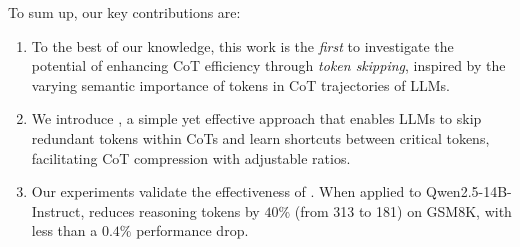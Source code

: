 To sum up, our key contributions are:
\begin{enumerate}
    \item To the best of our knowledge, this work is the \textit{first} to investigate the potential of enhancing CoT efficiency through \textit{token skipping}, inspired by the varying semantic importance of tokens in CoT trajectories of LLMs.
    \item We introduce \method, a simple yet effective approach that enables LLMs to skip redundant tokens within CoTs and learn shortcuts between critical tokens, facilitating CoT compression with adjustable ratios.
    \item Our experiments validate the effectiveness of \method. When applied to Qwen2.5-14B-Instruct, \method reduces reasoning tokens by $40\%$ (from 313 to 181) on GSM8K, with less than a $0.4\%$ performance drop.
\end{enumerate}

